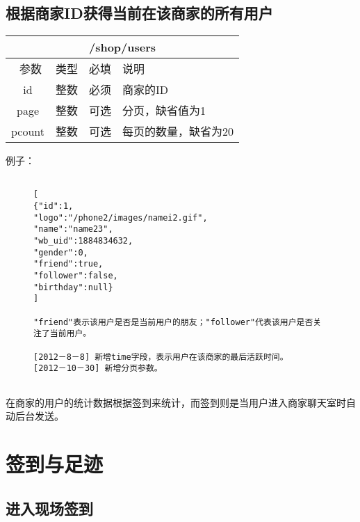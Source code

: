 \documentclass[cs4size]{ctexartutf8}
\begin{document}
\subsection{根据商家ID获得当前在该商家的所有用户}

\begin{table}[H]
   \begin{center}
\begin{tabular}{|c|c|c|p{12cm}|}
\hline
\multicolumn{4}{|c|}{/shop/users} \\
\hline\hline
 \  参数  & 类型 & 必填 &  说明  \\
\hline
 id  & 整数 & 必须 & 商家的ID\\
  \hline
 page  & 整数 & 可选 & 分页，缺省值为1\\ 
 \hline
 pcount  & 整数 & 可选 & 每页的数量，缺省为20\\ 
\hline
\end{tabular}
   \end{center}
\end{table}


例子：

\begin{figure}[H]
\begin{verbatim}

[
{"id":1,
"logo":"/phone2/images/namei2.gif",
"name":"name23",
"wb_uid":1884834632,
"gender":0,
"friend":true,
"follower":false,
"birthday":null}
]

"friend"表示该用户是否是当前用户的朋友；"follower"代表该用户是否关注了当前用户。

[2012－8－8] 新增time字段，表示用户在该商家的最后活跃时间。
[2012－10－30] 新增分页参数。


\end{verbatim}
\end{figure}



在商家的用户的统计数据根据签到来统计，而签到则是当用户进入商家聊天室时自动后台发送。



\section{签到与足迹}

\subsection{进入现场签到}
\end{document}

